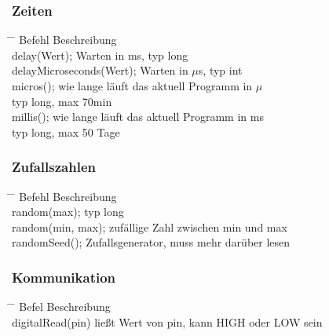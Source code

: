 \documentclass[10pt,a4paper,oneside]{article}
\begin{document}
\subsubsection{Zeiten}
\begin{tabbing}
  \hspace*{1mm} \=\hspace{50mm} \= \kill
  \>Befehl \>Beschreibung \\
  \>delay(Wert); \> Warten in ms, typ long\\
  \>delayMicroseconds(Wert); \> Warten in
  \begin{math}\mu
  \end{math}s, typ int \\
  \>micros(); \> wie lange läuft das aktuell Programm in 
  \begin{math}\mu 
  \end{math}\\ 
  \> \> typ long, max 70min \\
  \>millis(); \> wie lange läuft das aktuell Programm in ms \\ 
  \> \>  typ long, max 50 Tage\\
\end{tabbing}


\subsubsection{Zufallszahlen}
\begin{tabbing}
  \hspace*{1mm} \=\hspace{50mm} \= \kill
  \>Befehl \>Beschreibung \\
  \>random(max); \> typ long \\
  \>random(min, max); \> zufällige Zahl zwischen min und max\\
  \>randomSeed(); \> Zufallsgenerator, muss mehr darüber lesen\\
\end{tabbing}


\subsubsection{Kommunikation}
\begin{tabbing}
  \hspace*{1mm} \=\hspace{50mm} \= \kill
  \>Befel \>Beschreibung \\
  \>digitalRead(pin) \> ließt Wert von pin, kann HIGH oder LOW sein \\
\end{tabbing}
\end{document}
